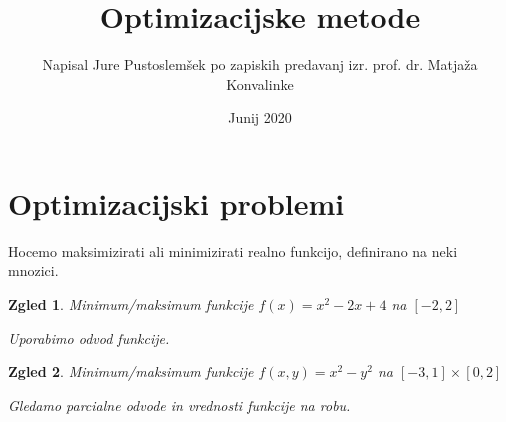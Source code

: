 \documentclass[11pt, a4paper]{article}
\begin{document}
    \newtheorem{theorem}{Izrek}[section]
    \newtheorem{definition}[theorem]{Definicija}
    \newtheorem{corollary}[theorem]{Posledica}
    \newtheorem{lemma}[theorem]{Lema}
    \newtheorem*{remark}{Opomba}
    \newtheorem{poroposition}[theorem]{Trditev}
    \newtheorem{example}[theorem]{Zgled}


    \title{Optimizacijske metode}
    \author{Napisal Jure Pustoslemšek po zapiskih predavanj izr. prof. dr. Matjaža Konvalinke}
    \date{Junij 2020}
    \maketitle

    \section{Optimizacijski problemi}

    Hocemo maksimizirati ali minimizirati realno funkcijo, definirano na neki mnozici.

        \begin{example}
            Minimum/maksimum funkcije \(f(x)=x^2-2x+4\) na \([-2,2]\)
            \par
            Uporabimo odvod funkcije.
        \end{example}

        \begin{example}
            Minimum/maksimum funkcije \(f(x,y)=x^2-y^2\) na \([-3,1]\times[0,2]\)
            \par
            Gledamo parcialne odvode in vrednosti funkcije na robu.
        \end{example}
\end{document}

